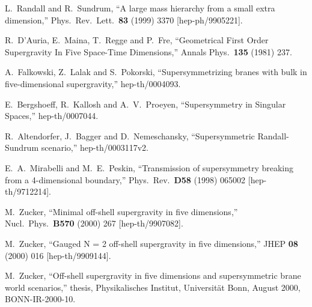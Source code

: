 \documentclass[a4paper,12pt, twoside]{article}
\numberwithin{equation}{section}
\begin{document}
\begin{thebibliography}{99}



L.~Randall and R.~Sundrum,
``A large mass hierarchy from a small extra dimension,''
Phys.\ Rev.\ Lett.\  {\bf 83} (1999) 3370
[hep-ph/9905221].


R.~D'Auria, E.~Maina, T.~Regge and P.~Fre,
``Geometrical First Order Supergravity In Five Space-Time Dimensions,''
Annals Phys.\  {\bf 135} (1981) 237.


A.~Falkowski, Z.~Lalak and S.~Pokorski,
``Supersymmetrizing branes with bulk in five-dimensional 
supergravity,''
hep-th/0004093.


E.~Bergshoeff, R.~Kallosh and A.~V.~Proeyen,
``Supersymmetry in Singular Spaces,''
hep-th/0007044.



R.~Altendorfer, J.~Bagger and D.~Nemeschansky,
``Supersymmetric Randall-Sundrum scenario,''
hep-th/0003117v2.


E.~A.~Mirabelli and M.~E.~Peskin,
``Transmission of supersymmetry breaking from a 4-dimensional 
boundary,''
Phys.\ Rev.\  {\bf D58} (1998) 065002
[hep-th/9712214].


M.~Zucker,
``Minimal off-shell supergravity in five dimensions,''
Nucl.\ Phys.\  {\bf B570} (2000) 267
[hep-th/9907082].


M.~Zucker,
``Gauged N = 2 off-shell supergravity in five dimensions,''
JHEP {\bf 08} (2000) 016
[hep-th/9909144].


M.~Zucker,
``Off-shell supergravity in five dimensions and supersymmetric brane 
world scenarios,''
thesis, Physikalisches Institut, Universit\"at Bonn, August 2000, 
BONN-IR-2000-10.



\end{thebibliography}
\end{document}
